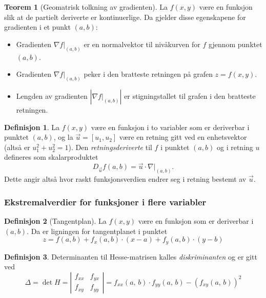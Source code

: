 \documentclass[11pt]{article}
\theoremstyle{definition}
\newtheorem{mindef}{Definisjon}[section]
\newenvironment{fmindef}
{\begin{mdframed}[style=minstil]\begin{mindef}}
		{\end{mindef}\end{mdframed}}
\theoremstyle{definition}
\theoremstyle{definition}
\theoremstyle{definition}
\newtheorem{teo}{Teorem}[section]
\newenvironment{fteo}
{\begin{mdframed}[style=minstil]\begin{teo}}
		{\end{teo}\end{mdframed}}
\theoremstyle{definition}
\theoremstyle{definition}
\begin{document}
\begin{fteo}[Geomatrisk tolkning av gradienten]
	
	La \(f(x,y)\) være en funksjon slik at de partielt deriverte er kontinuerlige.
	Da gjelder disse egenskapene for gradienten i et punkt \((a,b)\):
	\begin{itemize}
		\item Gradienten \(\nabla f\big|_{(a,b)} \) er en normalvektor til nivåkurven for \(f\) gjennom punktet \((a,b)\).
		\item Gradienten \(\nabla f\big|_{(a,b)} \) peker i den bratteste retningen på grafen \(z=f(x,y)\).
		\item Lengden av gradienten \(\left| \nabla f\big|_{(a,b)} \right| \) er stigningstallet til grafen i den bratteste retningen.
	\end{itemize}
	
\end{fteo}

\begin{fmindef}
	La \(f(x,y)\) være en funksjon i to variabler som er deriverbar i punktet \((a,b)\), og la \(\vec{u}=[u_1,u_2] \) være en retning gitt ved en enhetsvektor (altså er \(u_1^2+u_2^2=1\)). Den \textit{retningsderiverte} til \(f\) i punktet \((a,b)\) og i retning \(u\) defineres som skalarproduktet \[D_{\vec{u}}f(a,b)=\vec{u}\cdot \nabla \big|_{(a,b)}. \]
	Dette angir altså hvor raskt funksjonsverdien endrer seg i retning bestemt av \(\vec{u} \).
\end{fmindef}

\newpage

\subsubsection{Ekstremalverdier for funksjoner i flere variabler}

\begin{fmindef}[Tangentplan]
	La \(f(x,y) \) være en funksjon som er deriverbar i \( (a,b)\). Da er ligningen for tangentplanet i punktet
	\[z=f(a,b)+f_x(a,b)\cdot (x-a)+f_y(a,b)\cdot (y-b) \]
\end{fmindef}

\begin{fmindef}
	Determinanten til Hesse-matrisen kalles \textit{diskriminanten} og er gitt ved 
	\[\Delta =\det{H}=\left| \begin{array}{rr} 
	f_{xx} & f_{yx} \\
	f_{xy} & f_{yy}
	\end{array} \right|=f_{xx}(a,\,b)\cdot f_{yy}(a,\,b)-\left( f_{xy}(a,\,b)\right)^2  \]
\end{fmindef}
\end{document}
